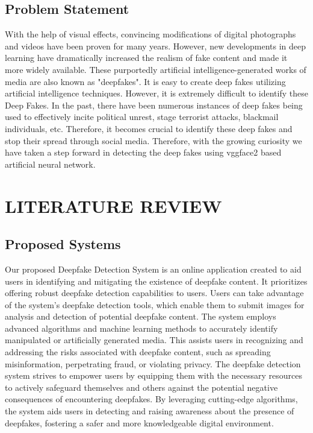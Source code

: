 \newpage


\subsection{Problem Statement}
With the help of visual effects, convincing modifications of digital photographs and videos have been proven for many years. However, new developments in deep learning have dramatically increased the realism of fake content and made it more widely available.   These purportedly artificial intelligence-generated works of media are also known as "deepfakes". It is easy to create deep fakes utilizing artificial intelligence techniques. However, it is extremely difficult to identify these Deep Fakes. In the past, there have been numerous instances of deep fakes being used to effectively incite political unrest, stage terrorist attacks, blackmail individuals, etc. Therefore, it becomes crucial to identify these deep fakes and stop their spread through social media. Therefore, with the growing curiosity we have taken a
step forward in detecting the deep fakes using vggface2 based artificial neural network.
\newpage



\newpage



\newpage


\section{LITERATURE REVIEW}
\newpage




\newpage


\subsection{Proposed Systems}
Our proposed Deepfake Detection System is an online application created to aid users in identifying and mitigating the existence of deepfake content. It prioritizes offering robust deepfake detection capabilities to users. Users can take advantage of the system's deepfake detection tools, which enable them to submit images for analysis and detection of potential deepfake content. The system employs advanced algorithms and machine learning methods to accurately identify manipulated or artificially generated media. This assists users in recognizing and addressing the risks associated with deepfake content, such as spreading misinformation, perpetrating fraud, or violating privacy. The deepfake detection system strives to empower users by equipping them with the necessary resources to actively safeguard themselves and others against the potential negative consequences of encountering deepfakes. By leveraging cutting-edge algorithms, the system aids users in detecting and raising awareness about the presence of deepfakes, fostering a safer and more knowledgeable digital environment.
\newpage

